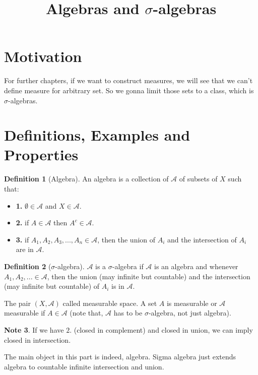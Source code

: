 \documentclass[11pt,a4paper]{article}
\title{\textbf{Algebras and $\sigma$-algebras}}
\theoremstyle{definition}
\newtheorem{definition}{Definition}[section]
\newtheorem{note}[definition]{Note}
\theoremstyle{plain}
\newcommand{\A}{\mathcal{A}}
\begin{document}
\maketitle
\tableofcontents
\newpage

\section{Motivation}
\begin{mynote}
For further chapters, if we want to construct measures, we will see that we can't define measure for arbitrary set. So we gonna limit those sets to a class, which is $\sigma$-algebras.
\end{mynote}

\section{Definitions, Examples and Properties}
\begin{definition}[Algebra]
An algebra is a collection of $\mathcal{A}$ of subsets of $X$ such that:
\begin{itemize}
    \item \textbf{1.} $\emptyset \in \A$ and $X\in \A$.
    \item \textbf{2.} if $A \in \A$ then $A^c \in \A$.
    \item \textbf{3.} if $A_1, A_2,A_3,..., A_n\in \A$, then the union of $A_i$ and the intersection of $A_i$ are in $\A$.  
\end{itemize}
\end{definition}

\begin{definition}[$\sigma$-algebra]
$\A$ is a $\sigma$-algebra if $\A$ is an algebra and whenever $A_1, A_2,... \in \A$, then the union (may infinite but countable) and the intersection (may infinite but countable) of $A_i$ is in $\A$.

The pair $(X, \A)$ called measurable space. A set $A$ is measurable or $\A$ measurable if $A \in \A$ (note that, $\A$ has to be $\sigma$-algebra, not just  algebra).
\end{definition}

\begin{note}
If we have $2.$ (closed in complement) and closed in union, we can imply closed in intersection.
\end{note}

\begin{mynote}
The main object in this part is indeed, algebra. Sigma algebra just extends algebra to countable infinite intersection and union.    
\end{mynote}
\end{document}
